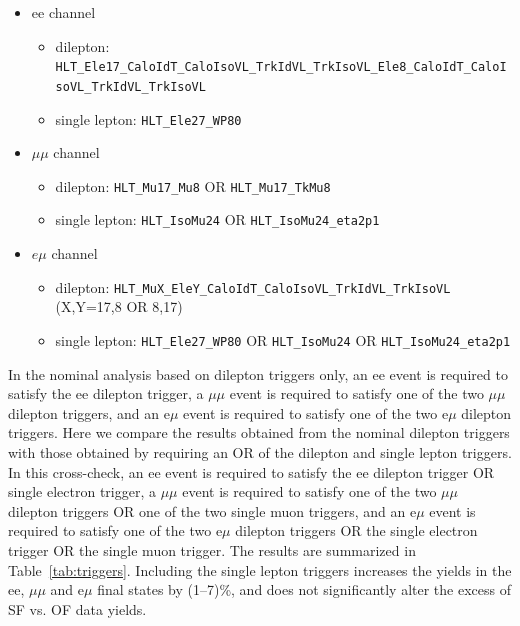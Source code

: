\begin{itemize}

\item ee channel
\begin{itemize}
\item dilepton: {\footnotesize \verb=HLT_Ele17_CaloIdT_CaloIsoVL_TrkIdVL_TrkIsoVL_Ele8_CaloIdT_CaloIsoVL_TrkIdVL_TrkIsoVL=}
\item single lepton: \verb=HLT_Ele27_WP80=
\end{itemize}

\item $\mu\mu$ channel
\begin{itemize}
\item dilepton: \verb=HLT_Mu17_Mu8= OR \verb=HLT_Mu17_TkMu8=
\item single lepton: \verb=HLT_IsoMu24= OR \verb=HLT_IsoMu24_eta2p1=
\end{itemize}

\item $e\mu$ channel
\begin{itemize}
\item dilepton: \verb=HLT_MuX_EleY_CaloIdT_CaloIsoVL_TrkIdVL_TrkIsoVL= (X,Y=17,8 OR 8,17)
\item single lepton: \verb=HLT_Ele27_WP80= OR \verb=HLT_IsoMu24= OR \verb=HLT_IsoMu24_eta2p1=
\end{itemize}

\end{itemize}


In the nominal analysis based on dilepton triggers only, an ee event is required to satisfy the ee dilepton trigger, a $\mu\mu$ event is required to
satisfy one of the two $\mu\mu$ dilepton triggers, and an e$\mu$ event is required to satisfy one of the two e$\mu$ dilepton triggers. Here we compare
the results obtained from the nominal dilepton triggers with those obtained by requiring an OR of the dilepton and single lepton triggers. In this cross-check,
an ee event is required to satisfy the ee dilepton trigger OR single electron trigger, a $\mu\mu$ event is required to
satisfy one of the two $\mu\mu$ dilepton triggers OR one of the two single muon triggers, and an e$\mu$ event is required to satisfy one of the two e$\mu$ dilepton triggers
OR the single electron trigger OR the single muon trigger. The results are summarized in Table~\ref{tab:triggers}. Including the single lepton triggers increases
the yields in the ee, $\mu\mu$ and e$\mu$ final states by (1--7)\%, and does not significantly alter the excess of SF vs. OF data yields.

